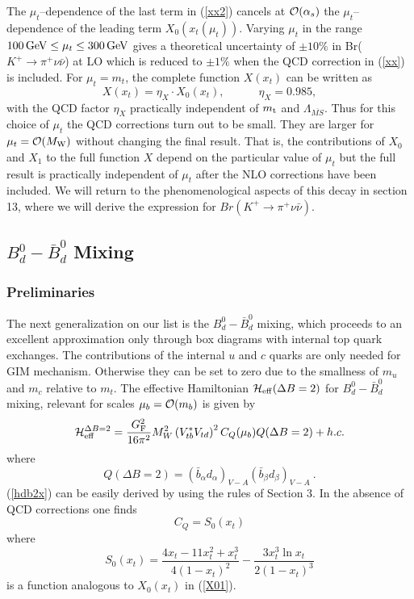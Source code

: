 \documentclass[12pt,rotate]{article}
\def\as{\alpha_s}
\def\Heff{{\cal H}_{\rm eff}}
\newcommand{\mt}{m_{\rm t}}
\newcommand{\mw}{M_{\rm W}}
\newcommand{\gev}{\, {\rm GeV}}
\newcommand{\be}{\begin{equation}}
\newcommand{\ee}{\end{equation}}
\newcommand{\ord}{{\cal O}}
\def\kpnn{$K^+\rightarrow\pi^+\nu\bar\nu$}
\begin{document}
\begin{itemize}
\begin{itemize}
The $\mu_t$--dependence of the last term in (\ref{xx2}) cancels at
$\ord(\as)$ the $\mu_t$--dependence of the leading term 
$X_0(x_t(\mu_t))$.
Varying $\mu_t$ in the range  $100\gev\le\mu_t\le 300\gev$ gives
a theoretical uncertainty of $\pm 10 \% $ in Br(\kpnn) at LO which
is reduced to $\pm 1 \% $ when the QCD correction in (\ref{xx}) is
included. 
For $\mu_t=m_t$, the complete function $X(x_t)$ can  be written as
\begin{equation}\label{xeta}
X(x_t)=\eta_X\cdot X_0(x_t), \qquad\quad \eta_X=0.985,
\end{equation}
with the QCD factor $\eta_X$
practically independent of $\mt$ and $\Lambda_{\overline{MS}}$.
Thus for this choice of $\mu_t$ the QCD corrections turn out to
be small. They are larger for $\mu_t=\ord(\mw)$ without changing
the final result. That is, the contributions of $X_0$ and $X_1$
to the full function $X$ depend on the particular value of $\mu_t$
but the full result is practically independent of $\mu_t$ after
the NLO corrections have been included. We will return to the
phenomenological aspects of this decay in section 13, where we
will derive the expression for $Br(K^+\to\pi^+\nu\bar\nu)$.
\subsection{$B^0_d-\bar B^0_d$ Mixing}
\subsubsection{Preliminaries}
The next generalization on our list is the $B^0_d-\bar B^0_d$ mixing,
which proceeds to an excellent approximation only through box diagrams
with internal top quark exchanges. The contributions of the internal
$u$ and $c$ quarks are only needed for GIM mechanism. Otherwise they
can be set to zero due to the smallness of $m_u$ and $m_c$ 
relative to $m_t$. The effective Hamiltonian
$\Heff(\Delta B=2)$ for $B_d^0-\bar B_d^0$
mixing, relevant for scales $\mu_b=\ord(m_b)$ is
given by
\begin{equation}\label{hdb2x}
{\cal H}^{\Delta B=2}_{\rm eff}=\frac{G^2_{\rm F}}{16\pi^2}M^2_W
 \left(V^\ast_{tb}V_{td}\right)^2 
 C_Q(\mu_b) Q(\Delta B=2) + h. c.
\end{equation}
where
\begin{equation}\label{qbdbdx}
Q(\Delta B=2)=(\bar b_\alpha d_\alpha)_{V-A}(\bar b_\beta d_\beta)_{V-A}~.
\end{equation}
(\ref{hdb2x}) can be easily derived by using the rules of Section 3.
In the absence of QCD corrections one finds 
\be
C_Q=S_0(x_t)
\ee
where
\begin{equation}\label{S0a}
S_0(x_t)=\frac{4x_t-11x^2_t+x^3_t}{4(1-x_t)^2}-
 \frac{3x^3_t \ln x_t}{2(1-x_t)^3}
\end{equation}
is a function analogous to $X_0(x_t)$ in (\ref{X01}).

\end{itemize}
\end{itemize}
\end{document}

